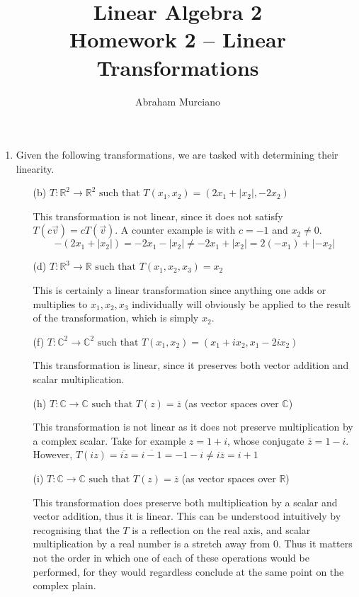 \documentclass{article}
\title{Linear Algebra 2 \\
\medskip
\large Homework 2 -- Linear Transformations}
\author{Abraham Murciano}
\newenvironment{answers}{ %
	\begin{enumerate}
		\setlength{\itemsep}{\bigskipamount}
}{\end{enumerate}}
\newcommand{\R}{\mathbb{R}}
\newcommand{\C}{\mathbb{C}}
\newcommand{\st}{\text{ such that }}
\begin{document}
\maketitle

\begin{answers}

	\item
		Given the following transformations, we are tasked with determining their linearity.
		\begin{enumerate}
			\item[(b)]
				\(T : \R^2 \to \R^2 \st T(x_1, x_2) = (2x_1 + |x_2|, -2x_2)\)

				This transformation is not linear, since it does not satisfy \(T(c\vec{v}) = cT(\vec{v})\). A counter example is with \(c = -1\) and \(x_2 \neq 0\).
				\begin{equation*}
					-(2x_1 + |x_2|) = -2x_1 - |x_2| \neq -2x_1 + |x_2| = 2(-x_1) + |-x_2|
				\end{equation*}

			\item[(d)]
				\(T : \R^3 \to \R \st T(x_1, x_2, x_3) = x_2\)

				This is certainly a linear transformation since anything one adds or multiplies to \(x_1, x_2, x_3\) individually will obviously be applied to the result of the transformation, which is simply \(x_2\).

			\item[(f)]
				\(T : \C^2 \to \C^2 \st T(x_1, x_2) = (x_1 + ix_2, x_1 - 2ix_2)\)

				This transformation is linear, since it preserves both vector addition and scalar multiplication.

			\item[(h)]
				\(T : \C \to \C \st T(z) = \overline{z}\) (as vector spaces over \(\C\))

				This transformation is not linear as it does not preserve multiplication by a complex scalar. Take for example \(z = 1 + i\), whose conjugate \(\overline{z} = 1 - i\). However, \(T(iz) = \overline{iz} = \overline{i - 1} = -1 - i \neq i\overline{z} = i + 1\)

			\item[(i)]
				\(T : \C \to \C \st T(z) = \overline{z}\) (as vector spaces over \(\R\))

				This transformation does preserve both multiplication by a scalar and vector addition, thus it is linear. This can be understood intuitively by recognising that the \(T\) is a reflection on the real axis, and scalar multiplication by a real number is a stretch away from 0. Thus it matters not the order in which one of each of these operations would be performed, for they would regardless conclude at the same point on the complex plain.


\end{enumerate}
\end{answers}
\end{document}
